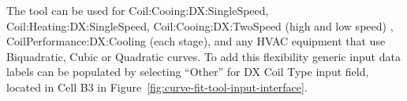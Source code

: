 The tool can be used for Coil:Cooing:DX:SingleSpeed, Coil:Heating:DX:SingleSpeed, Coil:Cooing:DX:TwoSpeed (high and low speed) , CoilPerformance:DX:Cooling (each stage), and any HVAC equipment that use Biquadratic, Cubic or Quadratic curves. To add this flexibility generic input data labels can be populated by selecting ``Other'' for DX Coil Type input field, located in Cell B3 in Figure~\ref{fig:curve-fit-tool-input-interface}.
